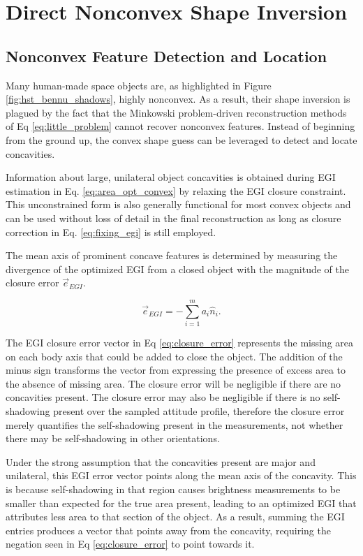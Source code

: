 \section{Direct Nonconvex Shape Inversion}

\subsection{Nonconvex Feature Detection and Location}

Many human-made space objects are, as highlighted in Figure \ref{fig:hst_bennu_shadows}, highly nonconvex. As a result, their shape inversion is plagued by the fact that the Minkowski problem-driven reconstruction methods of Eq \ref{eq:little_problem} cannot recover nonconvex features. Instead of beginning from the ground up, the convex shape guess can be leveraged to detect and locate concavities.

Information about large, unilateral object concavities is obtained during EGI estimation in Eq. \ref{eq:area_opt_convex} by relaxing the EGI closure constraint. This unconstrained form is also generally functional for most convex objects and can be used without loss of detail in the final reconstruction as long as closure correction in Eq. \ref{eq:fixing_egi} is still employed.

The mean axis of prominent concave features is determined by measuring the divergence of the optimized EGI from a closed object with the magnitude of the closure error $\vec{e}_{EGI}$.

\begin{equation} \label{eq:closure_error}
  \vec{e}_{EGI} = -\sum_{i=1}^{m} a_i \hat{n}_i.
\end{equation}

The EGI closure error vector in Eq \ref{eq:closure_error} represents the missing area on each body axis that could be added to close the object. The addition of the minus sign transforms the vector from expressing the presence of excess area to the absence of missing area. The closure error will be negligible if there are no concavities present. The closure error may also be negligible if there is no self-shadowing present over the sampled attitude profile, therefore the closure error merely quantifies the self-shadowing present in the measurements, not whether there may be self-shadowing in other orientations.

Under the strong assumption that the concavities present are major and unilateral, this EGI error vector points along the mean axis of the concavity. This is because self-shadowing in that region causes brightness measurements to be smaller than expected for the true area present, leading to an optimized EGI that attributes less area to that section of the object. As a result, summing the EGI entries produces a vector that points away from the concavity, requiring the negation seen in Eq \ref{eq:closure_error} to point towards it.

